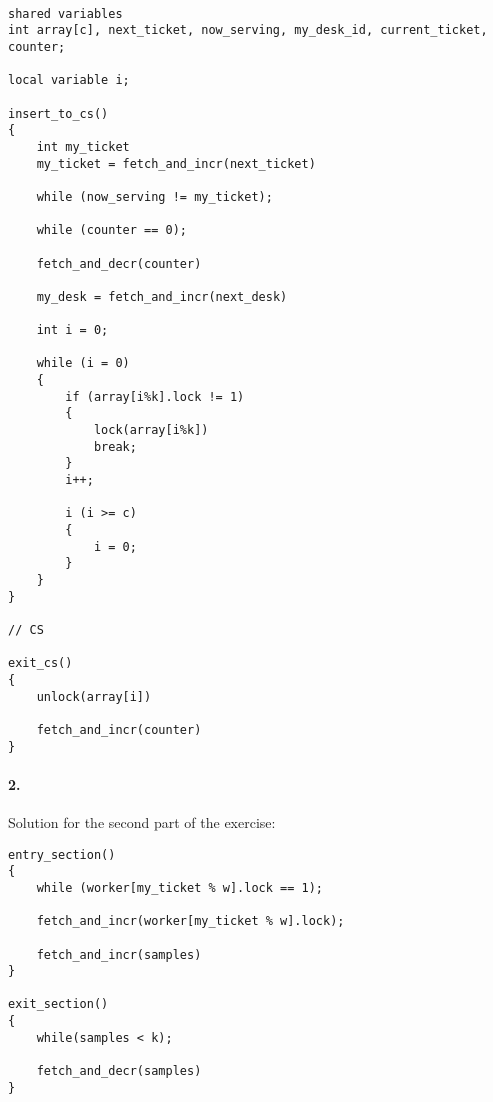 \begin{lstlisting}[style=mycode]

shared variables
int array[c], next_ticket, now_serving, my_desk_id, current_ticket, counter;

local variable i;

insert_to_cs()
{
	int my_ticket	
	my_ticket = fetch_and_incr(next_ticket)

	while (now_serving != my_ticket);

	while (counter == 0);

	fetch_and_decr(counter)

	my_desk = fetch_and_incr(next_desk)

	int i = 0;

	while (i = 0)
	{
		if (array[i%k].lock != 1)
		{
			lock(array[i%k])
			break;
		}
		i++;

		i (i >= c)
		{
			i = 0;
		}
	}
}

// CS

exit_cs()
{
	unlock(array[i])

	fetch_and_incr(counter)
}

\end{lstlisting}

\paragraph{2.}
Solution for the second part of the exercise:

\begin{lstlisting}[style=mycode]
entry_section()
{
	while (worker[my_ticket % w].lock == 1);
	
	fetch_and_incr(worker[my_ticket % w].lock);

	fetch_and_incr(samples)
}

exit_section()
{
	while(samples < k);

	fetch_and_decr(samples)
}

\end{lstlisting}
